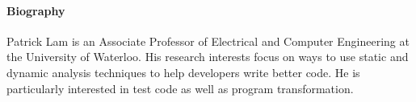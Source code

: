 \documentclass[sigplan,screen]{acmart}\settopmatter{}
\begin{document}
\paragraph{Biography} Patrick Lam is an Associate Professor of Electrical and Computer Engineering at the University of Waterloo. His research interests focus on ways to use static and dynamic analysis techniques to help developers write better code. He is particularly interested in test code as well as program transformation.

	
	
	
\end{document}
